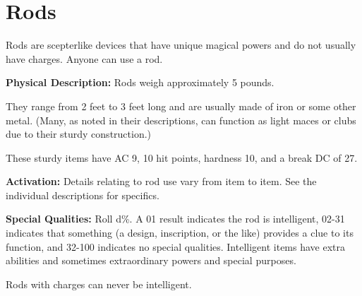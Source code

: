 
\section{Rods}

Rods are scepterlike devices that have unique magical powers and do not usually 
have charges. Anyone can use a rod.

\textbf{Physical Description:} Rods weigh approximately 5 pounds.

They range from 2 feet to 3 feet long and are usually made of iron or some other 
metal. (Many, as noted in their descriptions, can function as light maces or clubs 
due to their sturdy construction.)

These sturdy items have AC 9, 10 hit points, hardness 10, and a break DC of 27.

\textbf{Activation:} Details relating to rod use vary from item to item. See the 
individual descriptions for specifics.

\textbf{Special Qualities:} Roll d\%. A 01 result indicates the rod is intelligent, 
02-31 indicates that something (a design, inscription, or the like) provides a 
clue to its function, and 32-100 indicates no special qualities. Intelligent items 
have extra abilities and sometimes extraordinary powers and special purposes.

Rods with charges can never be intelligent.

